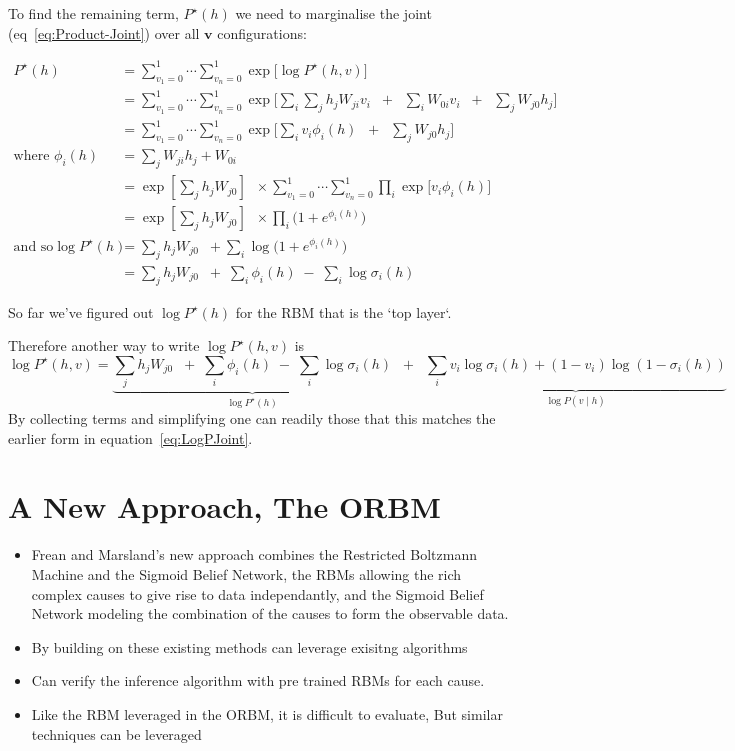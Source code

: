 To find the remaining term, $P^\star(h)$ we need to marginalise the  joint (eq~\ref{eq:Product-Joint}) over all $\mathbf{v}$ configurations:

$$
 \begin{aligned}
P^\star(h) &= \sum_{v_1=0}^1 \cdots \sum_{v_n=0}^1 \exp \bigg[  \log P^{\star}(h,v) \bigg] \\
&= \sum_{v_1=0}^1 \cdots \sum_{v_n=0}^1 \exp \bigg[  \sum_i  \sum_j h_j W_{ji} v_i \;\; + \;\; \sum_i W_{0i} v_i \;\; + \;\; \sum_j W_{j0} h_j \bigg] \\
&= \sum_{v_1=0}^1 \cdots \sum_{v_n=0}^1 \exp \bigg[  \sum_i v_i \phi_i(h)  \;\; + \;\; \sum_j W_{j0} h_j \bigg] \\
\text{where } \phi_i(h) &= \sum_j W_{ji} h_j + W_{0i} \\
&= \exp\left[ \sum_j h_j  W_{j0} \right] \;\; \times \sum_{v_1=0}^1 \cdots \sum_{v_n=0}^1 \prod_i \exp\bigg[ v_i \phi_i(h) \bigg] \\
&= \exp\left[\sum_j h_j  W_{j0}\right] \;\; \times \prod_i \bigg( 1 + e^{\phi_i(h) } \bigg) \\
\text{and so}
\log P^\star(h) &= \sum_j h_j  W_{j0} \;\; +  \sum_i \log \bigg( 1 + e^{\phi_i(h) } \bigg)
\\
&= \sum_j h_j  W_{j0} \;\; + \; \sum_i \phi_i(h) \;  - \; \sum_i \log \sigma_i(h)
\end{aligned}
$$

So far we've figured out $\log P^\star(h)$ for the RBM that is the `top layer`.

Therefore another way to write $\log P^\star(h,v)$ is
$$
\log P^\star(h,v) = \underbrace{\sum_j h_j  W_{j0} \;\; + \; \sum_i \phi_i(h) \;  - \; \sum_i \log \sigma_i(h)}_{\log P^\star(h)} \;\;+\;\; \underbrace{\sum_i v_i \log \sigma_i(h) + (1-v_i) \log (1 - \sigma_i(h))}_{\log P(v \mid h)}
$$
By collecting terms and simplifying one can readily those that this matches the earlier form in equation~\ref{eq:LogPJoint}.


\section{A New Approach, The ORBM}

\begin{itemize}
  \item Frean and Marsland's new approach combines the Restricted Boltzmann Machine and the Sigmoid Belief Network, the RBMs allowing the rich complex causes to give rise to data independantly, and the Sigmoid Belief Network modeling the combination of the causes to form the observable data.
  \item By building on these existing methods can leverage exisitng algorithms
  \item Can verify the inference algorithm with pre trained RBMs for each cause. 
  \item Like the RBM leveraged in the ORBM, it is difficult to evaluate, But similar techniques can be leveraged
\end{itemize}

